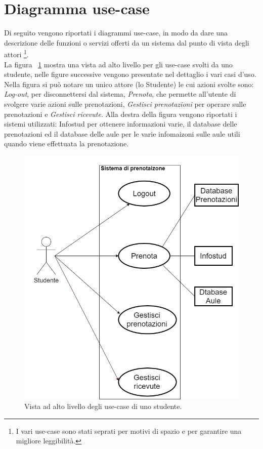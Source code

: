 \section{Diagramma use-case}
Di seguito vengono riportati i diagrammi use-case, in modo da dare una descrizione delle funzioni o servizi offerti da un sistema dal punto di vista degli attori \footnote{I vari use-case sono stati seprati per motivi di spazio e per garantire una migliore leggibilità.}.\\


La figura ~\ref{figura: generale} mostra una vista ad alto livello per gli use-case svolti da uno studente, nelle figure successive vengono presentate nel dettaglio i vari casi d’uso.
Nella figura si può notare un unico attore (lo Studente) le cui azioni svolte sono: \textit{Log-out}, per disconnettersi  dal sistema, \textit{Prenota}, che permette all’utente di svolgere varie azioni sulle prenotazioni, \textit{Gestisci prenotazioni} per operare sulle prenotazioni e \textit{Gestisci ricevute}. Alla destra della figura vengono riportati i sistemi utilizzati: Infostud per ottenere informazioni varie, il database delle prenotazioni ed il database delle aule per le varie infomaizoni sulle aule utili quando viene effettuata la prenotazione.

\begin{figure}[H]
\begin{center}
  \includegraphics[width=1 \textwidth]{Figure/use-case generale.png}
    \caption{Vista ad alto livello degli use-case di uno studente.}\label{figura: generale}
\end{center}
\end{figure}



